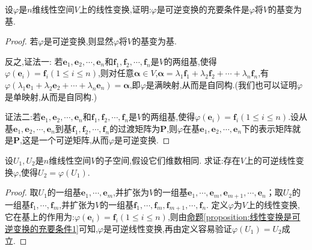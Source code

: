\documentclass[../../main.tex]{subfiles}%
\begin{document}
\begin{proposition}\label{proposition:线性变换是可逆变换的充要条件1}
设\(\varphi\)是\(n\)维线性空间\(V\)上的线性变换,证明:\(\varphi\)是可逆变换的充要条件是\(\varphi\)将\(V\)的基变为基.
\end{proposition}
\begin{proof}
若\(\varphi\)是可逆变换,则显然\(\varphi\)将\(V\)的基变为基.

反之,{\color{blue}证法一:}
若\(\boldsymbol{e}_1,\boldsymbol{e}_2,\cdots,\boldsymbol{e}_n\)和\(\boldsymbol{f}_1,\boldsymbol{f}_2,\cdots,\boldsymbol{f}_n\)是\(V\)的两组基,使得\(\varphi(\boldsymbol{e}_i)=\boldsymbol{f}_i(1\leqslant  i\leqslant  n)\),则对任意\(\boldsymbol{\alpha}\in V\),\(\boldsymbol{\alpha}=\lambda_1\boldsymbol{f}_1+\lambda_2\boldsymbol{f}_2+\cdots+\lambda_n\boldsymbol{f}_n\),有\(\varphi(\lambda_1\boldsymbol{e}_1+\lambda_2\boldsymbol{e}_2+\cdots+\lambda_n\boldsymbol{e}_n)=\boldsymbol{\alpha}\),即\(\varphi\)是满映射,从而是自同构.(我们也可以证明\(\varphi\)是单映射,从而是自同构.) 

{\color{blue}证法二:}若\(\boldsymbol{e}_1,\boldsymbol{e}_2,\cdots,\boldsymbol{e}_n\)和\(\boldsymbol{f}_1,\boldsymbol{f}_2,\cdots,\boldsymbol{f}_n\)是\(V\)的两组基,使得\(\varphi(\boldsymbol{e}_i)=\boldsymbol{f}_i(1\leqslant  i\leqslant  n)\).设从基\(\boldsymbol{e}_1,\boldsymbol{e}_2,\cdots,\boldsymbol{e}_n\)到基\(\boldsymbol{f}_1,\boldsymbol{f}_2,\cdots,\boldsymbol{f}_n\)的过渡矩阵为\(\boldsymbol{P}\),则\(\varphi\)在基\(\boldsymbol{e}_1,\boldsymbol{e}_2,\cdots,\boldsymbol{e}_n\)下的表示矩阵就是\(\boldsymbol{P}\),这是一个可逆矩阵,从而\(\varphi\)是可逆变换. 
\end{proof}

\begin{proposition}\label{proposition:两个维数相同的线性空间一定可以通过一个可逆线性变换联系起来}
设\(U_1,U_2\)是\(n\)维线性空间\(V\)的子空间,假设它们维数相同. 求证:存在\(V\)上的可逆线性变换\(\varphi\),使得\(U_2 = \varphi(U_1)\).
\end{proposition}
\begin{proof}
取\(U_1\)的一组基\(\boldsymbol{e}_1,\cdots,\boldsymbol{e}_m\),并扩张为\(V\)的一组基\(\boldsymbol{e}_1,\cdots,\boldsymbol{e}_m,\boldsymbol{e}_{m + 1},\cdots,\boldsymbol{e}_n\)；取\(U_2\)的一组基\(\boldsymbol{f}_1,\cdots,\boldsymbol{f}_m\),并扩张为\(V\)的一组基\(\boldsymbol{f}_1,\cdots,\boldsymbol{f}_m,\boldsymbol{f}_{m + 1},\cdots,\boldsymbol{f}_n\). 定义\(\varphi\)为\(V\)上的线性变换,它在基上的作用为:\(\varphi(\boldsymbol{e}_i)=\boldsymbol{f}_i(1\leqslant  i\leqslant  n)\),则由\hyperref[proposition:线性变换是可逆变换的充要条件1]{命题\ref{proposition:线性变换是可逆变换的充要条件1}}可知,\(\varphi\)是可逆线性变换,再由定义容易验证\(\varphi(U_1)=U_2\)成立. 
\end{proof}
\end{document}
